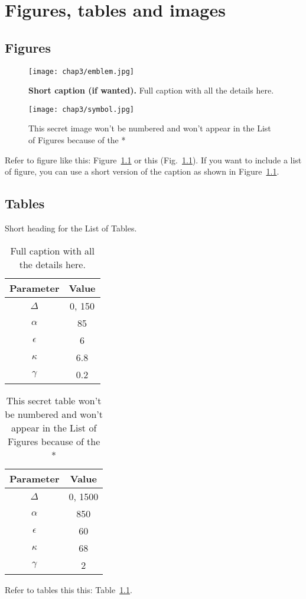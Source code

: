 

\chapter{Figures, tables and images} \label{chap-3}

\section{Figures}

\begin{figure}
    \center
    \texttt{[image: chap3/emblem.jpg]}
    \caption[Short caption for List of Figures]{{\bfseries Short caption (if wanted).} Full caption with all the details here.}
    \label{fig-example}
\end{figure}

\begin{figure}
    \center
    \texttt{[image: chap3/symbol.jpg]}
    \caption*{This secret image won't be numbered and won't appear in the List of Figures because of the *}
\end{figure}

Refer to figure like this: Figure~\ref{fig-example} or this (Fig.~\ref{fig-example}). If you want to include a list of figure, you can use a short version of the caption as shown in Figure~\ref{fig-example}.


\section{Tables}

\begin{table}
    \center
    \caption{Short heading for the List of Tables.}
    \begin{tabular}{c|c}
        Parameter    & Value  \\ \hline \hline
        $\Delta$     & 0, 150 \\
        ${\alpha}$   & 85     \\
        ${\epsilon}$ & 6      \\
        ${\kappa}$   & 6.8    \\
        ${\gamma}$   & 0.2
    \end{tabular}
    \label{tab-values}
    \caption*{Full caption with all the details here.}
\end{table}

\begin{table} \center
    \begin{tabular}{c|c}
        Parameter    & Value   \\ \hline \hline
        $\Delta$     & 0, 1500 \\
        ${\alpha}$   & 850     \\
        ${\epsilon}$ & 60      \\
        ${\kappa}$   & 68      \\
        ${\gamma}$   & 2
    \end{tabular}
    \caption*{This secret table won't be numbered and won't appear in the List of Figures because of the * }
\end{table}


Refer to tables this this: Table~\ref{tab-values}.